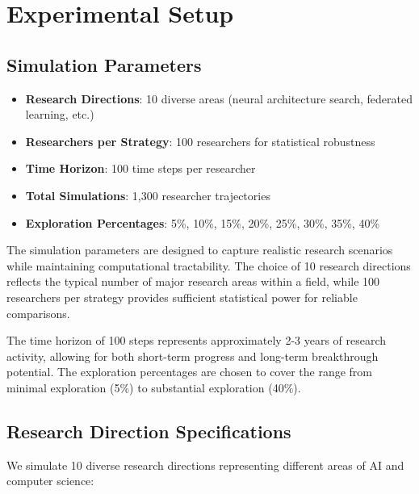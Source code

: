 \documentclass[letterpaper]{article}
\begin{document}
\section{Experimental Setup}

\subsection{Simulation Parameters}

\begin{itemize}
\item \textbf{Research Directions}: 10 diverse areas (neural architecture search, federated learning, etc.)
\item \textbf{Researchers per Strategy}: 100 researchers for statistical robustness
\item \textbf{Time Horizon}: 100 time steps per researcher
\item \textbf{Total Simulations}: 1,300 researcher trajectories
\item \textbf{Exploration Percentages}: 5\%, 10\%, 15\%, 20\%, 25\%, 30\%, 35\%, 40\%
\end{itemize}

The simulation parameters are designed to capture realistic research scenarios while maintaining computational tractability. The choice of 10 research directions reflects the typical number of major research areas within a field, while 100 researchers per strategy provides sufficient statistical power for reliable comparisons.

The time horizon of 100 steps represents approximately 2-3 years of research activity, allowing for both short-term progress and long-term breakthrough potential. The exploration percentages are chosen to cover the range from minimal exploration (5\%) to substantial exploration (40\%).

\subsection{Research Direction Specifications}

We simulate 10 diverse research directions representing different areas of AI and computer science:
\end{document}
